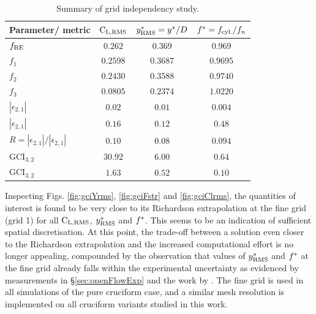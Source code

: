 \documentclass[oneside]{utmthesis}
\begin{document}
\begin{table}[!ht]
\centering
\caption{Summary of grid independency study.} \label{tab:gridIndependency}
\vspace{\baselineskip}
\begin{tabular}{l c c c}
  \hline
  \hline
Parameter/ metric                                                       & $\text{C}_{\text{L,RMS}}$       & $y^{*}_{\text{RMS}} = y^{*}/D$ & $f^{*} = f_{\text{cyl.}} / f_{n}$ \\
  \hline
$f_{\text{RE}}$                                                                  & $0.262$        & $0.369$           & $0.969$               \\
$f_{1}$                                                                 & $0.2598$       & $0.3687$          & $0.9695$              \\
$f_{2}$                                                                 & $0.2430$       & $0.3588$          & $0.9740$              \\
$f_{3}$                                                                 & $0.0805$       & $0.2374$          & $1.0220$              \\
$\left | \epsilon_{2,1} \right |$                                       & $0.02$         & $0.01$            & $0.004$               \\
$\left | \epsilon_{2,1} \right |$                                       & $0.16$         & $0.12$            & $0.48$                \\
$R = \left | \epsilon_{2,1} \right | / \left | \epsilon_{2,1} \right |$ & $0.10$         & $0.08$            & $0.094$               \\
$\text{GCI}_{3,2}$                                                      & $30.92$        & $6.00$            & $0.64$                \\  
$\text{GCI}_{3,2}$                                                      & $1.63$         & $0.52$            & $0.10$                \\
  \hline
  \hline
\end{tabular}
\end{table}

Inspecting Figs. \ref{fig:gciYrms}, \ref{fig:gciFstr} and \ref{fig:gciClrms}, the quantities of interest is found to be very close to its Richardson extrapolation at the fine grid (grid 1) for all $\text{C}_{\text{L,RMS}}$, $y^{*}_{\text{RMS}}$ and $f^{*}$. This seems to be an indication of sufficient spatial discretisation. At this point, the trade-off between a solution even closer to the Richardson extrapolation and the increased computational effort is no longer appealing, compounded by the observation that values of $y^{*}_{\text{RMS}}$ and $f^{*}$ at the fine grid already falls within the experimental uncertainty as evidenced by measurements in \S \ref{sec:openFlowExp} and the work by \citet{Koide2013}. The fine grid is used in all simulations of the pure cruciform case, and a similar mesh resolution is implemented on all cruciform variants studied in this work.
\end{document}
